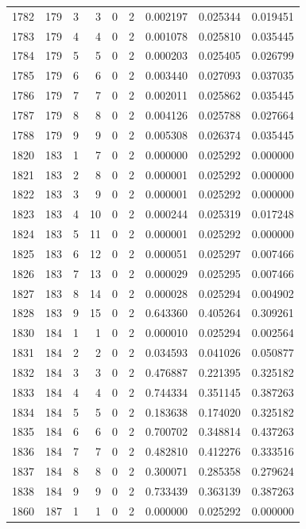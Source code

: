 \begin{longtable}{rrrrrrrrr}
1782 & 179 & 3 & 3 & 0 & 2 & 0.002197 & 0.025344 & 0.019451 \\
1783 & 179 & 4 & 4 & 0 & 2 & 0.001078 & 0.025810 & 0.035445 \\
1784 & 179 & 5 & 5 & 0 & 2 & 0.000203 & 0.025405 & 0.026799 \\
1785 & 179 & 6 & 6 & 0 & 2 & 0.003440 & 0.027093 & 0.037035 \\
1786 & 179 & 7 & 7 & 0 & 2 & 0.002011 & 0.025862 & 0.035445 \\
1787 & 179 & 8 & 8 & 0 & 2 & 0.004126 & 0.025788 & 0.027664 \\
1788 & 179 & 9 & 9 & 0 & 2 & 0.005308 & 0.026374 & 0.035445 \\
1820 & 183 & 1 & 7 & 0 & 2 & 0.000000 & 0.025292 & 0.000000 \\
1821 & 183 & 2 & 8 & 0 & 2 & 0.000001 & 0.025292 & 0.000000 \\
1822 & 183 & 3 & 9 & 0 & 2 & 0.000001 & 0.025292 & 0.000000 \\
1823 & 183 & 4 & 10 & 0 & 2 & 0.000244 & 0.025319 & 0.017248 \\
1824 & 183 & 5 & 11 & 0 & 2 & 0.000001 & 0.025292 & 0.000000 \\
1825 & 183 & 6 & 12 & 0 & 2 & 0.000051 & 0.025297 & 0.007466 \\
1826 & 183 & 7 & 13 & 0 & 2 & 0.000029 & 0.025295 & 0.007466 \\
1827 & 183 & 8 & 14 & 0 & 2 & 0.000028 & 0.025294 & 0.004902 \\
1828 & 183 & 9 & 15 & 0 & 2 & 0.643360 & 0.405264 & 0.309261 \\
1830 & 184 & 1 & 1 & 0 & 2 & 0.000010 & 0.025294 & 0.002564 \\
1831 & 184 & 2 & 2 & 0 & 2 & 0.034593 & 0.041026 & 0.050877 \\
1832 & 184 & 3 & 3 & 0 & 2 & 0.476887 & 0.221395 & 0.325182 \\
1833 & 184 & 4 & 4 & 0 & 2 & 0.744334 & 0.351145 & 0.387263 \\
1834 & 184 & 5 & 5 & 0 & 2 & 0.183638 & 0.174020 & 0.325182 \\
1835 & 184 & 6 & 6 & 0 & 2 & 0.700702 & 0.348814 & 0.437263 \\
1836 & 184 & 7 & 7 & 0 & 2 & 0.482810 & 0.412276 & 0.333516 \\
1837 & 184 & 8 & 8 & 0 & 2 & 0.300071 & 0.285358 & 0.279624 \\
1838 & 184 & 9 & 9 & 0 & 2 & 0.733439 & 0.363139 & 0.387263 \\
1860 & 187 & 1 & 1 & 0 & 2 & 0.000000 & 0.025292 & 0.000000 \\

\end{longtable}

